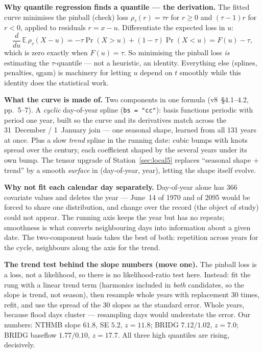 \documentclass[11pt]{article}
\newcommand{\code}[1]{\texttt{#1}}
\begin{document}
\textbf{Why quantile regression finds a quantile --- the derivation.} The
fitted curve minimises the pinball (check) loss
$\rho_\tau(r) = \tau r$ for $r \ge 0$ and $(\tau-1) r$ for $r < 0$, applied to
residuals $r = x - u$. Differentiate the expected loss in $u$:
\[
\frac{d}{du}\,\mathbb{E}\,\rho_\tau(X-u)
= -\tau \Pr(X > u) + (1-\tau)\Pr(X < u)
= F(u) - \tau ,
\]
which is zero exactly when $F(u) = \tau$. So minimising the pinball loss
\emph{is} estimating the $\tau$-quantile --- not a heuristic, an identity.
Everything else (splines, penalties, qgam) is machinery for letting $u$
depend on $t$ smoothly while this identity does the statistical work.

\textbf{What the curve is made of.} Two components in one formula
(v8~\S4.1--4.2, pp.~5--7). A \emph{cyclic} day-of-year spline
(\code{bs = "cc"}): basis functions periodic with period one year, built so
the curve and its derivatives match across the 31~December / 1~January join
--- one seasonal shape, learned from all 131 years at once. Plus a slow
\emph{trend} spline in the running date: cubic bumps with knots spread over
the century, each coefficient shaped by the several years under its own bump.
The tensor upgrade of Station~\ref{sec:local5} replaces ``seasonal shape
$+$ trend'' by a smooth \emph{surface} in (day-of-year, year), letting the
shape itself evolve.

\textbf{Why not fit each calendar day separately.} Day-of-year alone has 366
covariate values and deletes the year --- June~14 of 1970 and of 2095 would be
forced to share one distribution, and change over the record (the object of
study) could not appear. The running axis keeps the year but has no repeats;
smoothness is what converts neighbouring days into information about a given
date. The two-component basis takes the best of both: repetition across years
for the cycle, neighbours along the axis for the trend.

\textbf{The trend test behind the slope numbers (move one).} The pinball loss
is a loss, not a likelihood, so there is no likelihood-ratio test here.
Instead: fit the rung with a linear trend term (harmonics included in
\emph{both} candidates, so the slope is trend, not season), then resample
whole years with replacement 30 times, refit, and use the spread of the 30
slopes as the standard error. Whole years, because flood days cluster ---
resampling days would understate the error. Our numbers: NTHMB slope $61.8$,
SE $5.2$, $z = 11.8$; BRIDG $7.12/1.02$, $z=7.0$; BRIDG baseflow
$1.77/0.10$, $z = 17.7$. All three high quantiles are rising, decisively.
\end{document}
